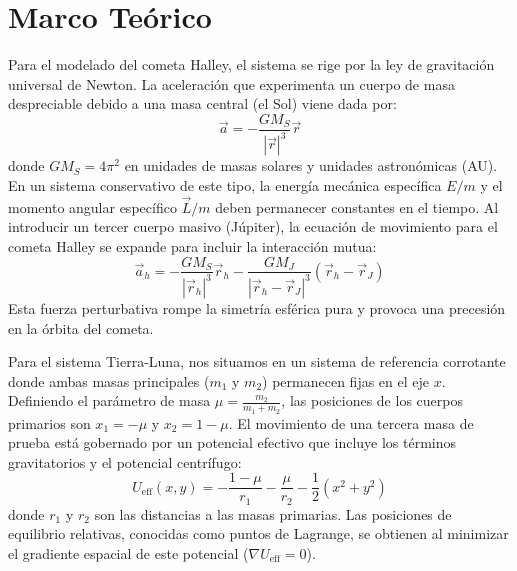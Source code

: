 \section{Marco Teórico}
Para el modelado del cometa Halley, el sistema se rige por la ley de gravitación universal de Newton. La aceleración que experimenta un cuerpo de masa despreciable debido a una masa central (el Sol) viene dada por:
$$
\vec{a} = - \frac{G M_S}{|\vec{r}|^3} \vec{r}
$$
donde $G M_S = 4 \pi^2$ en unidades de masas solares y unidades astronómicas (AU). En un sistema conservativo de este tipo, la energía mecánica específica $E/m$ y el momento angular específico $\vec{L}/m$ deben permanecer constantes en el tiempo. Al introducir un tercer cuerpo masivo (Júpiter), la ecuación de movimiento para el cometa Halley se expande para incluir la interacción mutua:
$$
\vec{a}_{h} = - \frac{G M_S}{|\vec{r}_{h}|^3} \vec{r}_{h} - \frac{G M_J}{|\vec{r}_{h} - \vec{r}_{J}|^3} (\vec{r}_{h} - \vec{r}_{J})
$$
Esta fuerza perturbativa rompe la simetría esférica pura y provoca una precesión en la órbita del cometa. 

Para el sistema Tierra-Luna, nos situamos en un sistema de referencia corrotante donde ambas masas principales ($m_1$ y $m_2$) permanecen fijas en el eje $x$. Definiendo el parámetro de masa $\mu = \frac{m_2}{m_1 + m_2}$, las posiciones de los cuerpos primarios son $x_1 = -\mu$ y $x_2 = 1 - \mu$. El movimiento de una tercera masa de prueba está gobernado por un potencial efectivo que incluye los términos gravitatorios y el potencial centrífugo:
$$
U_{\text{eff}}(x, y) = -\frac{1 - \mu}{r_1} - \frac{\mu}{r_2} - \frac{1}{2} (x^2 + y^2)
$$
donde $r_1$ y $r_2$ son las distancias a las masas primarias.  Las posiciones de equilibrio relativas, conocidas como puntos de Lagrange, se obtienen al minimizar el gradiente espacial de este potencial ($\nabla U_{\text{eff}} = 0$).